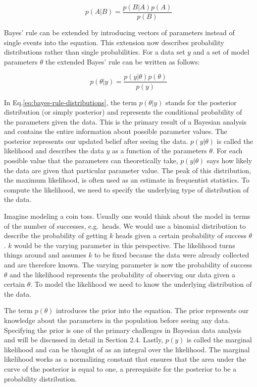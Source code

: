 \documentclass[
  doc,12pt,floatsintext]{apa7}
\begin{document}
\begin{equation}
p(A|B) = \frac{p(B|A)p(A)}{p(B)}
\label{eq:bayes-rule}
\end{equation}

Bayes' rule can be extended by introducing vectors of parameters instead of single events into the equation. This extension now describes probability distributions rather than single probabilities. For a data set \(y\) and a set of model parameters \(\theta\) the extended Bayes' rule can be written as follows:

\begin{equation}
p(\theta|y) = \frac{p(y|\theta)p(\theta)}{p(y)}
\label{eq:bayes-rule-distributions}
\end{equation}

In Eq.\eqref{eq:bayes-rule-distributions}, the term \(p(\theta|y)\) stands for the posterior distribution (or simply posterior) and represents the conditional probability of the parameters given the data. This is the primary result of a Bayesian analysis and contains the entire information about possible parameter values. The posterior represents our updated belief after seeing the data. \(p(y|\theta)\) is called the likelihood and describes the data \(y\) as a function of the parameters \(\theta\). For each possible value that the parameters can theoretically take, \(p(y|\theta)\) says how likely the data are given that particular parameter value. The peak of this distribution, the maximum likelihood, is often used as an estimate in frequentist statistics. To compute the likelihood, we need to specify the underlying type of distribution of the data.

Imagine modeling a coin toss. Usually one would think about the model in terms of the number of successes, e.g.~heads. We would use a binomial distribution to describe the probability of getting \(k\) heads given a certain probability of success \(\theta\). \(k\) would be the varying parameter in this perspective. The likelihood turns things around and assumes \(k\) to be fixed because the data were already collected and are therefore known. The varying parameter is now the probability of success \(\theta\) and the likelihood represents the probability of observing our data given a certain \(\theta\). To model the likelihood we need to know the underlying distribution of the data.

The term \(p(\theta)\) introduces the prior into the equation. The prior represents our knowledge about the parameters in the population before seeing any data. Specifying the prior is one of the primary challenges in Bayesian data analysis and will be discussed in detail in Section 2.4. Lastly, \(p(y)\) is called the marginal likelihood and can be thought of as an integral over the likelihood. The marginal likelihood works as a normalizing constant that ensures that the area under the curve of the posterior is equal to one, a prerequisite for the posterior to be a probability distribution.
\end{document}
